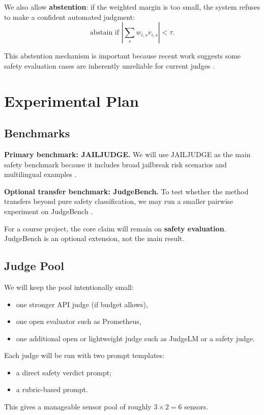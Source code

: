 \documentclass[11pt]{article}
\begin{document}
We also allow \textbf{abstention}: if the weighted margin is too small, the system refuses to make a confident automated judgment:
\[
\text{abstain if } \left|\sum_s w_{i,s}v_{i,s}\right| < \tau.
\]

This abstention mechanism is important because recent work suggests some safety evaluation cases are inherently unreliable for current judges \citep{schwinn2026coinflip,dev2026jrh}.

\section{Experimental Plan}
\subsection{Benchmarks}
\textbf{Primary benchmark: JAILJUDGE.} We will use JAILJUDGE as the main safety benchmark because it includes broad jailbreak risk scenarios and multilingual examples \citep{liu2024jailjudge}.

\textbf{Optional transfer benchmark: JudgeBench.} To test whether the method transfers beyond pure safety classification, we may run a smaller pairwise experiment on JudgeBench \citep{tan2024judgebench}.

For a course project, the core claim will remain on \textbf{safety evaluation}. JudgeBench is an optional extension, not the main result.

\subsection{Judge Pool}
We will keep the pool intentionally small:
\begin{itemize}
    \item one stronger API judge (if budget allows),
    \item one open evaluator such as Prometheus,
    \item one additional open or lightweight judge such as JudgeLM or a safety judge.
\end{itemize}

Each judge will be run with two prompt templates:
\begin{itemize}
    \item a direct safety verdict prompt;
    \item a rubric-based prompt.
\end{itemize}

This gives a manageable sensor pool of roughly $3 \times 2 = 6$ sensors.
\end{document}
